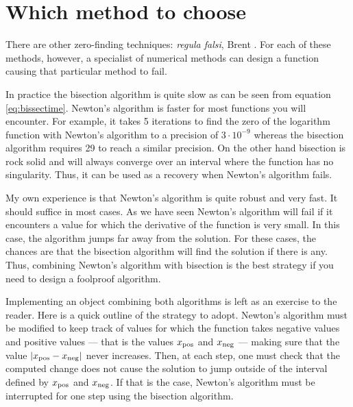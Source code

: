\documentclass[twoside]{book}
\begin{document}
\section{Which method to choose}
There are other zero-finding techniques: {\it regula falsi}, Brent
\cite{Press}. For each of these methods, however, a specialist of
numerical methods can design a function causing that particular
method to fail.

In practice the bisection algorithm is quite slow as can be seen
from equation \ref{eq:bissectime}. Newton's algorithm is faster
for most functions you will encounter. For example, it takes 5
iterations to find the zero of the logarithm function with
Newton's algorithm to a precision of $3\cdot 10^{-9}$ whereas the
bisection algorithm requires 29 to reach a similar precision. On
the other hand bisection is rock solid and will always converge
over an interval where the function has no singularity. Thus, it
can be used as a recovery when Newton's algorithm fails.

My own experience is that Newton's algorithm is quite robust and
very fast. It should suffice in most cases. As we have seen
Newton's algorithm will fail if it encounters a value for which
the derivative of the function is very small. In this case, the
algorithm jumps far away from the solution. For these cases, the
chances are that the bisection algorithm will find the solution if
there is any. Thus, combining Newton's algorithm with bisection is
the best strategy if you need to design a foolproof algorithm.

Implementing an object combining both algorithms is left as an
exercise to the reader. Here is a quick outline of the strategy to
adopt. Newton's algorithm must be modified to keep track of values
for which the function takes negative values and positive values
--- that is the values $x_{\mathop{\rm pos}}$ and $x_{\mathop{\rm neg}}$
--- making sure that the value $\left| x_{\mathop{\rm pos}}-x_{\mathop{\rm neg}}\right|$
never increases. Then, at each step, one must check that the
computed change does not cause the solution to jump outside of the
interval defined by $x_{\mathop{\rm pos}}$ and $x_{\mathop{\rm
neg}}$. If that is the case, Newton's algorithm must be
interrupted for one step using the bisection algorithm.

\ifx\wholebook\relax\else
\end{document}
